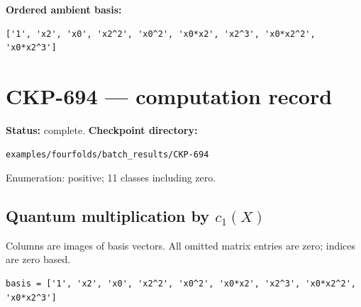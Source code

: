 \documentclass[10pt,a4paper]{article}
\begin{document}
\textbf{Ordered ambient basis:}
\begin{lstlisting}
['1', 'x2', 'x0', 'x2^2', 'x0^2', 'x0*x2', 'x2^3', 'x0*x2^2', 'x0*x2^3']
\end{lstlisting}

\clearpage\section*{CKP-694 --- computation record}
\textbf{Status:} complete.
\textbf{Checkpoint directory:}
\begin{lstlisting}
examples/fourfolds/batch_results/CKP-694
\end{lstlisting}

Enumeration: positive; 11 classes including zero.
\subsection*{Quantum multiplication by $c_1(X)$}
Columns are images of basis vectors. All omitted matrix entries are zero; indices are zero based.

\begin{lstlisting}
basis = ['1', 'x2', 'x0', 'x2^2', 'x0^2', 'x0*x2', 'x2^3', 'x0*x2^2', 'x0*x2^3']
\end{lstlisting}
\end{document}
